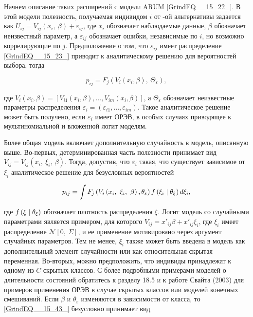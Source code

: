 Начнем описание таких расширений с модели ARUM \eqref{GrindEQ__15_22_}. В этой модели полезность, получаемая индивидом $i$ от -ой альтернативы задается как $U_{ij}=V_{ij}\left(x_i,\ \beta \right)+{\varepsilon }_{ij}$, где $x_i$ обозначает наблюдаемые данные, $\beta $ обозначает неизвестный параметр, а ${\varepsilon }_{ij}$ обозначает ошибки, независимые по $i$, но возможно коррелирующие по $j$. Предположение о том, что ${\varepsilon }_{ij}$ имеет распределение \eqref{GrindEQ__15_23_} приводит к аналитическому решению для вероятностей выбора, тогда 

\[p_{ij}=F_j\left(V_i\left(x_i,\beta \right),\ {\Theta }_{\varepsilon }\right),\] 

где $V_i\left(x_i,\beta \right)=[V_{i1}\left(x_i,\beta \right),\dots ,V_{im}\left(x_i,\beta \right)]$, а ${\Theta }_{\varepsilon }$ обозначает неизвестные параметры распределения ${\varepsilon }_i=\left({\varepsilon }_{i1},\dots ,{\varepsilon }_{im}\right).$  Такое аналитическое решение может быть получено, если ${\varepsilon }_i$ имеет ОРЭВ, в особых случаях приводящее к мультиномиальной и вложенной логит моделям.

Более общая модель включает дополнительную случайность в модель, описанную выше. Во-первых, детерминированная часть полезности принимает вид $V_{ij}=V_{ij}\left(x_i,\ {\xi }_i,\ \beta \right)$. Тогда, допустив, что ${\varepsilon }_i$ такая, что существует зависимое от${\xi }_i$ аналитическое решение для безусловных вероятностей

\begin{equation} \label{GrindEQ__15_43_} p_{ij}=\int{F_j\left(V_i\left(x_i,\ {\xi }_i,\ \beta \right),{\theta }_{\varepsilon }\right)f\left({\xi }_i\mathrel{\left|\vphantom{{\xi }_i {\theta }_{\xi }}\right.\kern-\nulldelimiterspace}{\theta }_{\xi }\right)d{\xi }_i}, \end{equation} 

где $f\left(\xi \mathrel{\left|\vphantom{\xi  {\theta }_{\xi }}\right.\kern-\nulldelimiterspace}{\theta }_{\xi }\right)$ обозначает плотность распределения $\xi $. Логит модель со случайными параметрами является примером, для которого $V_{ij}=x'_{ij}\beta +x'_{ij}{\xi }_i$, где ${\xi }_i$ имеет распределение ${\mathcal N}[0,\ \Sigma ]$, и ее применение мотивировано через аргумент случайных параметров. Тем не менее, ${\xi }_i$ также может быть введена в модель как дополнительный элемент случайности или как относительная скрытая переменная. Во-вторых, можно предположить, что индивиды принадлежат к одному из $C$ скрытых классов. С более подробными примерами моделей о длительности состояний обратитесь к разделу 18.5 и к работе Свайта (2003) для примеров применения ОРЭВ в случае скрытых классов или моделей конечных смешиваний. Если $\beta $ и ${\theta }_{\varepsilon }$ изменяются в зависимости от класса, то \eqref{GrindEQ__15_43_} безусловно принимает вид


